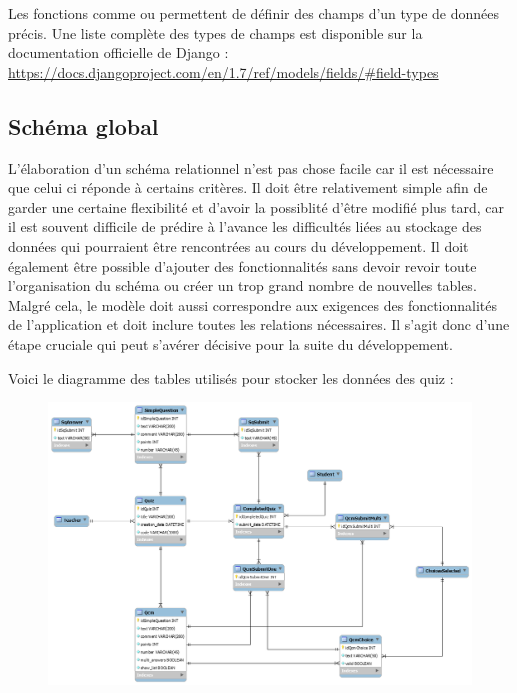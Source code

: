 \documentclass[letterpaper,10pt,french]{sphinxmanual}
\begin{document}
Les fonctions comme  ou  permettent de définir des champs d'un type de données précis. Une liste complète des types de champs est disponible sur la documentation officielle de Django : \href{https://docs.djangoproject.com/en/1.7/ref/models/fields/\#field-types}{https://docs.djangoproject.com/en/1.7/ref/models/fields/\#field-types}


\subsection{Schéma global}
\label{database:schema-global}
L'élaboration d'un schéma relationnel n'est pas chose facile car il est nécessaire que celui ci réponde à certains critères. Il doit être relativement simple afin de garder une certaine flexibilité et d'avoir la possiblité d'être modifié plus tard, car il est souvent difficile de prédire à l'avance les difficultés liées au stockage des données qui pourraient être rencontrées au cours du développement. Il doit également être possible d'ajouter des fonctionnalités sans devoir revoir toute l'organisation du schéma ou créer un trop grand nombre de nouvelles tables. Malgré cela, le modèle doit aussi correspondre aux exigences des fonctionnalités de l'application et doit inclure toutes les relations nécessaires. Il s'agit donc d'une étape cruciale qui peut s'avérer décisive pour la suite du développement.

Voici le diagramme des tables utilisés pour stocker les données des quiz :
\begin{figure}[htbp]
\centering

\includegraphics{quiz-models.png}
\end{figure}
\end{document}
